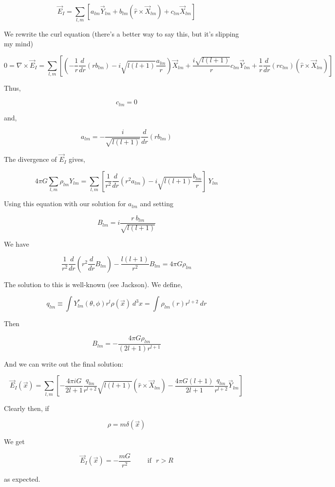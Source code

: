 \documentclass {article}
\begin{document}
$$\vec E_I =  \sum_{l,m} \left[a_{lm}\vec Y_{lm} +b_{lm} (\hat r \times \vec X_{lm}) +c_{lm}\vec X_{lm} \right] $$

We rewrite the curl equation (there's a better way to say this, but it's slipping my mind)

$$ 0 = \nabla \times \vec E_I  = \sum_{l, m} \left[ \left( - \frac 1 r \frac d {dr} (r b_{lm}) - i \sqrt {l ( l +1)}  \frac {a_{lm} } r \right) \vec X_{lm} + \frac {i \sqrt {l(l+1)} } r c_{lm} \vec Y_{lm} + \frac 1 r \frac d {dr} (r c_{lm}) (\hat r \times \vec X_{lm}) \right] $$

Thus,

$$ c_{lm} = 0 $$

and,

$$a_{lm} = - \frac i {\sqrt{l(l+1)} }\frac d {dr} (r b_{lm}) $$

The divergence of $\vec E_I$ gives,

$$ 4 \pi G \sum_{l, m} \rho_{lm} Y_{lm} = \sum_{l, m} \left[ \frac 1 {r^2} \frac d {dr} (r^2 a_{lm} ) - i \sqrt{l(l+1)} \frac {b_{lm}} r  \right] ~ Y_{lm} $$

Using this equation with our solution for $a_{lm}$ and setting 

$$B_{lm} = i \frac {r ~ b_{lm}} {\sqrt {l (l+1)}} $$

We have

$$\frac 1 {r^2} \frac d {dr} \left( r^2 \frac d {dr} B_{lm} \right) - \frac {l(l+1)} {r^2} B_{lm} = 4 \pi G \rho_{lm}$$

The solution to this is well-known (see Jackson). We define,

$$q_{lm} \equiv \int Y_{lm}^* (\theta, \phi) r^l  \rho (\vec x) ~ d^3x = \int \rho_{lm} (r) r^{l+2} ~ dr $$

Then 

$$ B_{lm} = - \frac {4 \pi G \rho_{lm}} {(2l +1) r^{l+1}} $$ 
 

And we can write out the final solution:

$$\vec E_I(\vec x) = \sum_{l,m} \left[ -\frac {4\pi i G }{2l+1} \frac {q_{lm}}{r^{l+2}} \sqrt {l(l+1)} \left(\hat r \times \vec X_{lm} \right)  - \frac {4 \pi G (l+1)}{2l+1} \frac {q_{lm}}{r^{l+2}} \vec Y_{lm} \right] $$


Clearly then, if

$$\rho = m\delta(\vec x) $$

We get

$$\vec E_I(\vec x) = - \frac {mG} {r^2}  ~~~~~~~~~~~ \textrm{if} ~~~ r > R$$

as expected.
\newpage
\end{document}
